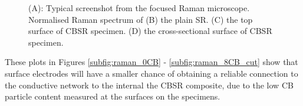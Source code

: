 \begin{figure}[H]
\begin{minipage}[t]{.49\textwidth}
{		}
	\end{minipage}
    \begin{minipage}[t]{.49\textwidth}
    	\centering
		\vfill
	\end{minipage}
	\caption{(A): Typical screenshot from the focused Raman microscope. Normalised Raman spectrum of (B) the plain SR. (C) the top surface of CBSR specimen. (D) the cross-sectional surface of CBSR specimen.}
	\label{fig:Raman_CB_SR}
\end{figure}
These plots in Figures \ref{subfig:raman_0CB} - \ref{subfig:raman_8CB_cut} show that surface electrodes will have a smaller chance of obtaining a reliable connection to the conductive network to the internal the CBSR composite, due to the low CB particle content measured at the surfaces on the specimens.

